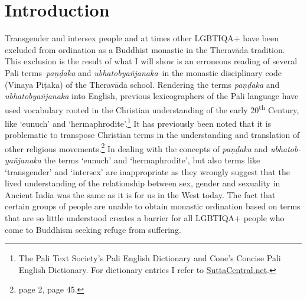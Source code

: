 \section{Introduction}
Transgender and intersex people and at times other LGBTIQA+ have been excluded from ordination as a Buddhist monastic in the Theravāda tradition. This exclusion is the result of what I will show is an erroneous reading of several Pali terms--{\em paṇḍaka} and {\em ubhatob­yañ­janaka}--in the monastic disciplinary code (Vinaya Piṭaka) of the Theravāda school. Rendering the terms {\em paṇḍaka} and {\em ubhatob­yañ­janaka} into English, previous lexicographers of the Pali language have used vocabulary rooted in the Christian understanding of the early 20\textsuperscript{th} Century, like `eunuch' and `hermaphrodite'.\footnote{The Pali Text Society's Pali English Dictionary and Cone's Concise Pali English Dictionary. For dictionary entries I refer to \href{https://suttacentral.net/}{SuttaCentral.net}.} It has previously been noted that it is problematic to transpose Christian terms in the understanding and translation of other religious movements.\footnote{\cite{maes} page 2, \cite{dudas} page 45.} In dealing with the concepts of {\em paṇḍaka} and {\em ubhatob­yañ­janaka} the terms `eunuch' and `hermaphrodite', but also terms like `transgender' and `intersex' are inappropriate as they wrongly suggest that the lived understanding of the relationship between sex, gender and sexuality in Ancient India was the same as it is for us in the West today. The fact that certain groups of people are unable to obtain monastic ordination based on terms that are so little understood creates a barrier for all LGBTIQA+ people who come to Buddhism seeking refuge from suffering.

